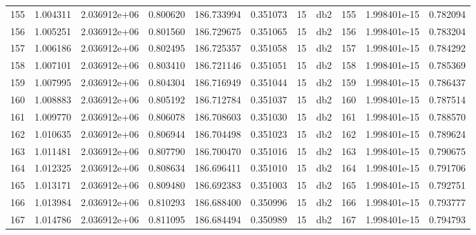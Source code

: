 \begin{tabular}{lrrrrrrlrrr}
155  &    1.004311 &        2.036912e+06 &  0.800620 &              186.733994 &    0.351073 &      15 &          db2 &    155 &   1.998401e-15 &      0.782094 \\
156  &    1.005251 &        2.036912e+06 &  0.801560 &              186.729675 &    0.351065 &      15 &          db2 &    156 &   1.998401e-15 &      0.783204 \\
157  &    1.006186 &        2.036912e+06 &  0.802495 &              186.725357 &    0.351058 &      15 &          db2 &    157 &   1.998401e-15 &      0.784292 \\
158  &    1.007101 &        2.036912e+06 &  0.803410 &              186.721146 &    0.351051 &      15 &          db2 &    158 &   1.998401e-15 &      0.785369 \\
159  &    1.007995 &        2.036912e+06 &  0.804304 &              186.716949 &    0.351044 &      15 &          db2 &    159 &   1.998401e-15 &      0.786437 \\
160  &    1.008883 &        2.036912e+06 &  0.805192 &              186.712784 &    0.351037 &      15 &          db2 &    160 &   1.998401e-15 &      0.787514 \\
161  &    1.009770 &        2.036912e+06 &  0.806078 &              186.708603 &    0.351030 &      15 &          db2 &    161 &   1.998401e-15 &      0.788570 \\
162  &    1.010635 &        2.036912e+06 &  0.806944 &              186.704498 &    0.351023 &      15 &          db2 &    162 &   1.998401e-15 &      0.789624 \\
163  &    1.011481 &        2.036912e+06 &  0.807790 &              186.700470 &    0.351016 &      15 &          db2 &    163 &   1.998401e-15 &      0.790675 \\
164  &    1.012325 &        2.036912e+06 &  0.808634 &              186.696411 &    0.351010 &      15 &          db2 &    164 &   1.998401e-15 &      0.791706 \\
165  &    1.013171 &        2.036912e+06 &  0.809480 &              186.692383 &    0.351003 &      15 &          db2 &    165 &   1.998401e-15 &      0.792751 \\
166  &    1.013984 &        2.036912e+06 &  0.810293 &              186.688400 &    0.350996 &      15 &          db2 &    166 &   1.998401e-15 &      0.793777 \\
167  &    1.014786 &        2.036912e+06 &  0.811095 &              186.684494 &    0.350989 &      15 &          db2 &    167 &   1.998401e-15 &      0.794793 \\

\end{tabular}
